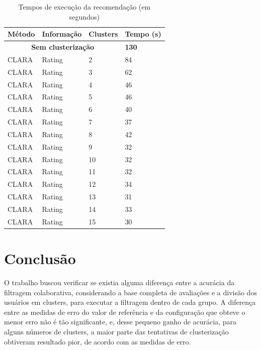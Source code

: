 \documentclass[12pt,a4paper,header]{abnt}
\begin{document}
\begin{longtable}{@{}llll@{}}
\caption{Tempos de execução da recomendação (em segundos)}
\label{tempos}\\
\toprule
\textbf{Método} & \textbf{Informação} & \textbf{Clusters} & \textbf{Tempo (s)} \\  \midrule
\endhead
%
\multicolumn{3}{c}{\textbf{Sem clusterização}}                     & \textbf{130}                \\
CLARA           & Rating              & 2                 & 84                 \\
CLARA           & Rating              & 3                 & 62                 \\
CLARA           & Rating              & 4                 & 46                 \\
CLARA           & Rating              & 5                 & 46                 \\
CLARA           & Rating              & 6                 & 40                 \\
CLARA           & Rating              & 7                 & 37                 \\
CLARA           & Rating              & 8                 & 42                 \\
CLARA           & Rating              & 9                 & 32                 \\
CLARA           & Rating              & 10                & 32                 \\
CLARA           & Rating              & 11                & 32                 \\
CLARA           & Rating              & 12                & 34                 \\
CLARA           & Rating              & 13                & 31                 \\
CLARA           & Rating              & 14                & 33                 \\
CLARA           & Rating              & 15                & 30 \\ \bottomrule                
\end{longtable}  

\chapter{Conclusão}

O trabalho buscou verificar se existia alguma diferença entre a acurácia da filtragem colaborativa, considerando a base completa de avaliações e a divisão dos usuários em clusters, para executar a filtragem dentro de cada grupo. A diferença entre as medidas de erro do valor de referência e da configuração que obteve o menor erro não é tão significante, e, desse pequeno ganho de acurácia, para alguns números de clusters, a maior parte das tentativas de clusterização obtiveram resultado pior, de acordo com as medidas de erro. 
\end{document}
